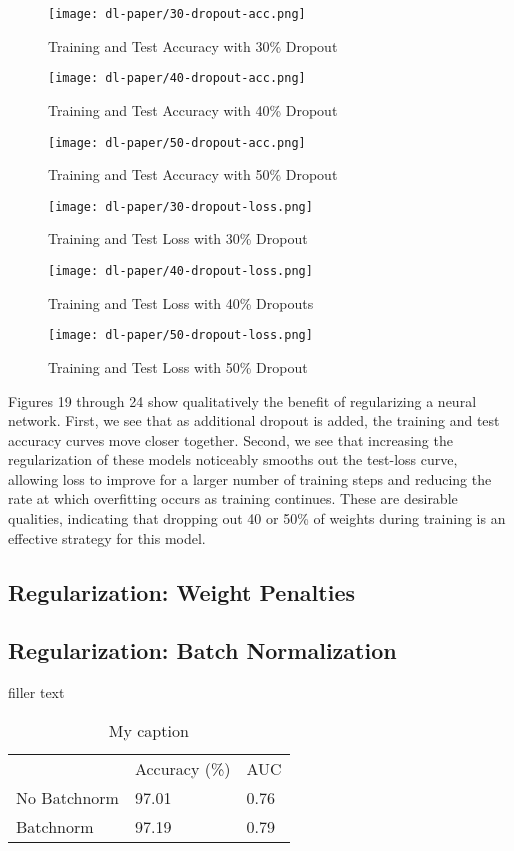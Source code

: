 \documentclass[12pt]{article}  %
\theoremstyle{definition}
\theoremstyle{remark}
\begin{document}
\begin{figure}[!htb]
  \texttt{[image: dl-paper/30-dropout-acc.png]}
  \caption{Training and Test Accuracy with 30\% Dropout}\label{30-drop}
\endminipage\hfill
{}
  \texttt{[image: dl-paper/40-dropout-acc.png]}
  \caption{Training and Test Accuracy with 40\% Dropout}\label{40-drop}
\endminipage\hfill
{}%
  \texttt{[image: dl-paper/50-dropout-acc.png]}
  \caption{Training and Test Accuracy with 50\% Dropout}\label{50-drop}
\endminipage
\end{figure}


\begin{figure}[!htb]
  \texttt{[image: dl-paper/30-dropout-loss.png]}
  \caption{Training and Test Loss with 30\% Dropout}\label{30-drop-loss}
\endminipage\hfill
{}
  \texttt{[image: dl-paper/40-dropout-loss.png]}
  \caption{Training and Test Loss with 40\% Dropouts}\label{40-drop-loss}
\endminipage\hfill
{}%
  \texttt{[image: dl-paper/50-dropout-loss.png]}
  \caption{Training and Test Loss with 50\% Dropout}\label{50-drop-loss}
\endminipage
\end{figure}

\par Figures 19 through 24 show qualitatively the benefit of regularizing a neural network. First, we see that as additional dropout is added, the training and test accuracy curves move closer together. Second, we see that increasing the regularization of these models noticeably smooths out the test-loss curve, allowing loss to improve for a larger number of training steps and reducing the rate at which overfitting occurs as training continues. These are desirable qualities, indicating that dropping out 40 or 50\% of weights during training is an effective strategy for this model. 

\subsection{Regularization: Weight Penalties}
\subsection{Regularization: Batch Normalization}
\par filler text

\begin{table}[]
\centering
\caption{My caption}
\label{my-label}
\begin{tabular}{lll}
             & Accuracy (\%) & AUC  \\
No Batchnorm & 97.01         & 0.76 \\
Batchnorm    & 97.19         & 0.79
\end{tabular}
\end{table}
\end{document}
